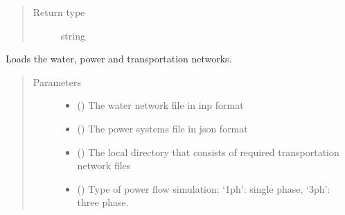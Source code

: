 \documentclass[letterpaper,10pt,english]{sphinxmanual}
\begin{document}
\begin{fulllineitems}
\begin{fulllineitems}
\begin{quote}
\begin{description}
\item[{Return type}] \leavevmode
\sphinxAtStartPar
string

\end{description}\end{quote}

\end{fulllineitems}


\begin{fulllineitems}
\label{\detokenize{apidoc:dreaminsg_integrated_model.src.network_sim_models.integrated_network.IntegratedNetwork.load_networks}}
\sphinxAtStartPar
Loads the water, power and transportation networks.
\begin{quote}\begin{description}
\item[{Parameters}] \leavevmode\begin{itemize}
\item {} 
\sphinxAtStartPar
{} () \textendash{} The water network file in inp format

\item {} 
\sphinxAtStartPar
{} () \textendash{} The power systems file in json format

\item {} 
\sphinxAtStartPar
{} () \textendash{} The local directory that consists of required transportation network files

\item {} 
\sphinxAtStartPar
{} () \textendash{} Type of power flow simulation: ‘1ph’: single phase, ‘3ph’: three phase.

\end{itemize}

\end{description}\end{quote}


\end{fulllineitems}
\end{fulllineitems}
\end{document}
